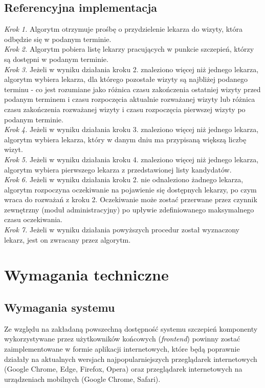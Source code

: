 \documentclass[a4paper,12pt,polish]{article}
\begin{document}
\subsection{Referencyjna implementacja}
\textit{Krok 1.} Algorytm otrzymuje prośbę o przydzielenie lekarza do wizyty, która odbędzie się w podanym terminie.\\
\textit{Krok 2.} Algorytm pobiera listę lekarzy pracujących w punkcie szczepień, którzy są dostępni w podanym terminie.\\
\textit{Krok 3.} Jeżeli w wyniku działania kroku 2. znaleziono więcej niż jednego lekarza, algorytm wybiera lekarza, dla którego pozostałe wizyty są najbliżej podanego terminu - co jest rozumiane jako różnica czasu zakończenia ostatniej wizyty przed podanym terminem i czasu rozpoczęcia aktualnie rozważanej wizyty lub różnica czasu zakończenia rozważanej wizyty i czasu rozpoczęcia pierwszej wizyty po podanym terminie.\\
\textit{Krok 4.} Jeżeli w wyniku działania kroku 3. znaleziono więcej niż jednego lekarza, algorytm wybiera lekarza, który w danym dniu ma przypisaną większą liczbę wizyt.\\
\textit{Krok 5.} Jeżeli w wyniku działania kroku 4. znaleziono więcej niż jednego lekarza, algorytm wybiera pierwszego lekarza z przedstawionej listy kandydatów.\\
\textit{Krok 6.} Jeżeli w wyniku działania kroku 2. nie odnaleziono żadnego lekarza, algorytm rozpoczyna oczekiwanie na pojawienie się dostępnych lekarzy, po czym wraca do rozważań z kroku 2. Oczekiwanie może zostać przerwane przez czynnik zewnętrzny (moduł administracyjny) po upływie zdefiniowanego maksymalnego czasu oczekiwania.\\
\textit{Krok 7.} Jeżeli w wyniku działania powyższych procedur został wyznaczony lekarz, jest on zwracany przez algorytm.\\

\newpage

\section{Wymagania techniczne}
\subsection{Wymagania systemu}
Ze względu na zakładaną powszechną dostępność systemu szczepień komponenty wykorzystywane przez użytkowników końcowych (\textit{frontend}) powinny zostać zaimplementowane w formie aplikacji internetowych, które będą poprawnie działały na aktualnych wersjach najpopularniejszych przeglądarek internetowych (Google Chrome, Edge, Firefox, Opera) oraz przeglądarek internetowych na urządzeniach mobilnych (Google Chrome, Safari).
\end{document}
